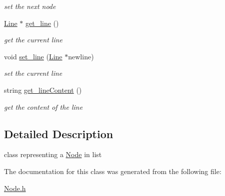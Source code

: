 \begin{DoxyCompactItemize}
\begin{DoxyCompactList}\small\item\em set the next node \end{DoxyCompactList}\item 
\hypertarget{class_node_a148767567f75e6d3e5e8f8ff9e438336}{
\hyperlink{class_line}{\-Line} $\ast$ \hyperlink{class_node_a148767567f75e6d3e5e8f8ff9e438336}{get\-\_\-line} ()}
\label{class_node_a148767567f75e6d3e5e8f8ff9e438336}

\begin{DoxyCompactList}\small\item\em get the current line \end{DoxyCompactList}\item 
\hypertarget{class_node_acb0fcb0970c2e2efd9ec90133ea8d236}{
void \hyperlink{class_node_acb0fcb0970c2e2efd9ec90133ea8d236}{set\-\_\-line} (\hyperlink{class_line}{\-Line} $\ast$newline)}
\label{class_node_acb0fcb0970c2e2efd9ec90133ea8d236}

\begin{DoxyCompactList}\small\item\em set the current line \end{DoxyCompactList}\item 
\hypertarget{class_node_a97c6b9e99919926b82b33444883754f1}{
string \hyperlink{class_node_a97c6b9e99919926b82b33444883754f1}{get\-\_\-line\-Content} ()}
\label{class_node_a97c6b9e99919926b82b33444883754f1}

\begin{DoxyCompactList}\small\item\em get the content of the line \end{DoxyCompactList}\end{DoxyCompactItemize}


\subsection{\-Detailed \-Description}
class representing a \hyperlink{class_node}{\-Node} in list 

\-The documentation for this class was generated from the following file\-:\begin{DoxyCompactItemize}
\item 
\hyperlink{_node_8h}{\-Node.\-h}\end{DoxyCompactItemize}
